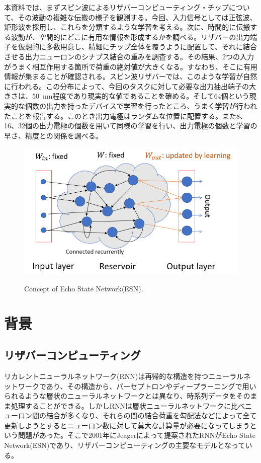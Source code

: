 \documentclass[a4j, twocolumn]{jsarticle}
\begin{document}
本資料では、まずスピン波によるリザバーコンピューティング・チップについて、その波動の複雑な伝搬の様子を観測する。今回、入力信号としては正弦波、矩形波を採用し、これらを分類するような学習を考える。次に、時間的に伝搬する波動が、空間的にどこに有用な情報を形成するかを調べる。リザバーの出力端子を仮想的に多数用意し、精細にチップ全体を覆うように配置して、それに結合させる出力ニューロンのシナプス結合の重みを調査する。その結果、2つの入力がうまく相互作用する箇所で荷重の絶対値が大きくなる。すなわち、そこに有用情報が集まることが確認される。スピン波リザバーでは、このような学習が自然に行われる。この分布によって、今回のタスクに対して必要な出力抽出端子の大きさは、50~nm程度であり現実的な値であることを確める。そして64個という現実的な個数の出力を持ったデバイスで学習を行ったところ、うまく学習が行われたことを報告する。このとき出力電極はランダムな位置に配置する。また8、16、32個の出力電極の個数を用いて同様の学習を行い、出力電極の個数と学習の早さ、精度との関係を調べる。

\begin{figure}
\centering
\includegraphics[width=1\hsize]{./figures/esn}\\
\caption{Concept of Echo State Network(ESN).}
\label{fig:esn}
\end{figure}

\section{背景}
\subsection{リザバーコンピューティング}
リカレントニューラルネットワーク(RNN)は再帰的な構造を持つニューラルネットワークであり、その構造から、パーセプトロンやディープラーニングで用いられるような層状のニューラルネットワークとは異なり、時系列データをそのまま処理することができる。しかしRNNは層状ニューラルネットワークに比べニューロン間の結合が多くなり、それらの間の結合荷重を勾配法などによって全て更新しようとするとニューロン数に対して莫大な計算量が必要になってしまうという問題があった。そこで2001年にJeagerによって提案されたRNNがEcho State Network(ESN)\cite{esn}であり、リザバーコンピューティングの主要なモデルとなっている。
\end{document}
